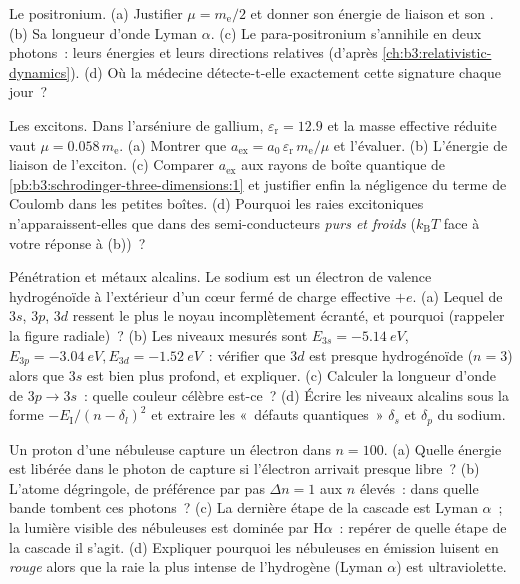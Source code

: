 \begin{exercise}[$\star\star$]\label{exo:b3:hydrogen-atom:6}
Le positronium. (a) Justifier $\mu = m_{\text{e}}/2$ et donner son
énergie de liaison et son . (b) Sa longueur d'onde
Lyman $\alpha$. (c) Le para-positronium s'annihile en deux photons~:
leurs énergies et leurs directions relatives (d'après
\cref{ch:b3:relativistic-dynamics}). (d) Où la médecine détecte-t-elle
exactement cette signature chaque jour~?
\end{exercise}

\begin{exercise}[$\star\star$]\label{exo:b3:hydrogen-atom:7}
Les excitons. Dans l'arséniure de gallium,
$\varepsilon_{\text{r}} = 12.9$ et la masse effective réduite vaut
$\mu = 0.058\,m_{\text{e}}$. (a) Montrer que
$a_{\text{ex}} = a_0\,\varepsilon_{\text{r}}\,m_{\text{e}}/\mu$ et
l'évaluer. (b) L'énergie de liaison de l'exciton. (c) Comparer
$a_{\text{ex}}$ aux rayons de boîte quantique de
\cref{pb:b3:schrodinger-three-dimensions:1} et justifier enfin la
négligence du terme de Coulomb dans les petites boîtes. (d) Pourquoi
les raies excitoniques n'apparaissent-elles que dans des
semi-conducteurs \emph{purs et froids} ($k_{\text{B}}T$ face à votre
réponse à (b))~?
\end{exercise}

\begin{exercise}[$\star\star$]\label{exo:b3:hydrogen-atom:8}
Pénétration et métaux alcalins. Le sodium est un électron de valence
hydrogénoïde à l'extérieur d'un cœur fermé de charge effective $+e$.
(a) Lequel de $3s$, $3p$, $3d$ ressent le plus le noyau incomplètement
écranté, et pourquoi (rappeler la figure radiale)~? (b) Les
niveaux mesurés sont $E_{3s} = \qty{-5.14}{eV}$, $E_{3p} = \qty{-3.04}{eV},
E_{3d} = \qty{-1.52}{eV}$~: vérifier que $3d$ est presque hydrogénoïde
($n = 3$) alors que $3s$ est bien plus profond, et expliquer. (c)
Calculer la longueur d'onde de $3p \to 3s$~: quelle couleur célèbre
est-ce~? (d) Écrire les niveaux alcalins sous la forme
$-E_{\text{I}}/(n - \delta_l)^2$ et extraire les «~défauts
quantiques~» $\delta_s$ et $\delta_p$ du sodium.
\end{exercise}

\begin{exercise}[$\star\star$]\label{exo:b3:hydrogen-atom:9}
Un proton d'une nébuleuse capture un électron dans $n = 100$. (a)
Quelle énergie est libérée dans le photon de capture si l'électron
arrivait presque libre~? (b) L'atome dégringole, de préférence par
pas $\Delta n = 1$ aux $n$ élevés~: dans quelle bande tombent ces
photons~? (c) La dernière étape de la cascade est Lyman $\alpha$~; la
lumière visible des nébuleuses est dominée par H$\alpha$~: repérer de
quelle étape de la cascade il s'agit. (d) Expliquer pourquoi les
nébuleuses en émission luisent en \emph{rouge} alors que la raie la
plus intense de l'hydrogène (Lyman $\alpha$) est ultraviolette.
\end{exercise}


